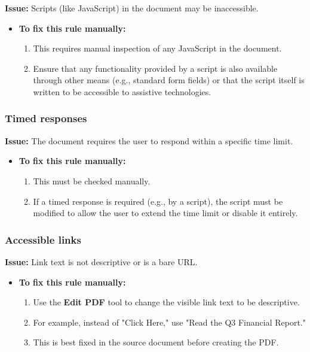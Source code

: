 \textbf{Issue:} Scripts (like JavaScript) in the document may be inaccessible.

\begin{itemize}
	\item \textbf{To fix this rule manually:}
	      \begin{enumerate}
		      \item This requires manual inspection of any JavaScript in the document.
		      \item Ensure that any functionality provided by a script is also available through other means (e.g., standard form fields) or that the script itself is written to be accessible to assistive technologies.
	      \end{enumerate}
\end{itemize}

\subsubsection{Timed responses}
\label{ssubsec:pdf-timed-responses}

\textbf{Issue:} The document requires the user to respond within a specific time limit.

\begin{itemize}
	\item \textbf{To fix this rule manually:}
	      \begin{enumerate}
		      \item This must be checked manually.
		      \item If a timed response is required (e.g., by a script), the script must be modified to allow the user to extend the time limit or disable it entirely.
	      \end{enumerate}
\end{itemize}

\subsubsection{Accessible links}
\label{ssubsec:pdf-accessible-links}

\textbf{Issue:} Link text is not descriptive or is a bare URL.

\begin{itemize}
	\item \textbf{To fix this rule manually:}
	      \begin{enumerate}
		      \item Use the \textbf{Edit PDF} tool to change the visible link text to be descriptive.
		      \item For example, instead of "Click Here," use "Read the Q3 Financial Report."
		      \item This is best fixed in the source document before creating the PDF.
	      \end{enumerate}
\end{itemize}

